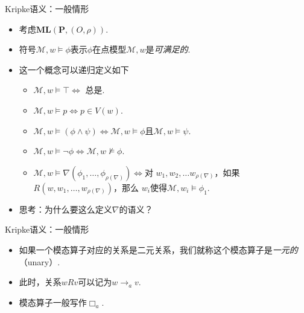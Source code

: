     
    {Kripke语义：一般情形}
    \begin{itemize}
        \item 考虑$\mathbf{ML}(\mathbf{P},(O,\rho))$.
        \item 符号$\mathcal M,w\vDash\phi$表示$\phi$在点模型$\mathcal M,w$是\emph{可满足的}.
        \item 这一个概念可以递归定义如下
        \begin{itemize}
            \item $\mathcal M, w\vDash\top\iff$ 总是.
            \item $\mathcal M, w\vDash p\iff p\in V(w)$.
            \item $\mathcal M, w\vDash (\phi\wedge\psi)\iff\mathcal M,w\vDash\phi$且$\mathcal M,w\vDash\psi$.
            \item $\mathcal M, w\vDash \neg\phi\iff\mathcal M,w\not\vDash\phi$.
            \item $\mathcal M, w\vDash \nabla(\phi_1,\dots,\phi_{\rho(\nabla)})\iff$对 $w_1,w_2,\dots w_{\rho(\nabla)}$，如果$R(w,w_1,\dots,w_{\rho(\nabla)})$，那么 $w_i$使得$\mathcal M,w_i\vDash\phi_1$.
        \end{itemize}
        \item 思考：为什么要这么定义$\nabla$的语义？
    \end{itemize}
    
    
    {Kripke语义：一般情形}
    \begin{itemize}
        \item 如果一个模态算子对应的关系是二元关系，我们就称这个模态算子是\emph{一元的}（unary）.
        \item 此时，关系$wRv$可以记为$w\to_a v$.
        \item 模态算子一般写作$\Box_a$.
    \end{itemize}
    
